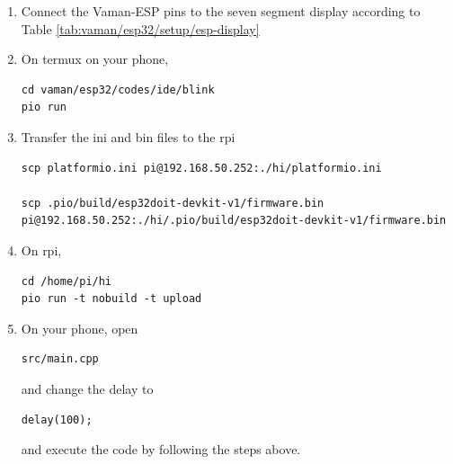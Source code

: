 \begin{enumerate}[label=\arabic*.,ref=\theenumi]
\item Connect the Vaman-ESP pins to the seven segment display  according to Table 
		\ref{tab:vaman/esp32/setup/esp-display}
	\begin{table}[!h]
		
		\caption{}
		\label{tab:vaman/esp32/setup/esp-display}
	\end{table}

\item On termux on your phone, 
\begin{lstlisting}
cd vaman/esp32/codes/ide/blink
pio run
\end{lstlisting}
\item Transfer the ini and bin files to the rpi 
\begin{lstlisting}
scp platformio.ini pi@192.168.50.252:./hi/platformio.ini

scp .pio/build/esp32doit-devkit-v1/firmware.bin pi@192.168.50.252:./hi/.pio/build/esp32doit-devkit-v1/firmware.bin
\end{lstlisting}
\item On rpi,
\begin{lstlisting}
cd /home/pi/hi
pio run -t nobuild -t upload
\end{lstlisting}
\item On your phone, open 
\begin{lstlisting}
src/main.cpp 
\end{lstlisting}
and change the delay to 
\begin{lstlisting}
delay(100);
\end{lstlisting}
and execute the code by following the steps above.
\iffalse
\end{enumerate}
